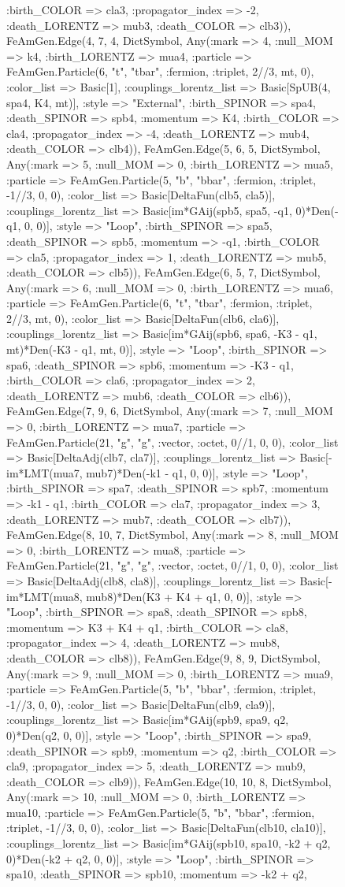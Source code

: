 \documentclass{revtex4}
\begin{document}
\begin{figure}[!htb]
\begin{center}
{:birth_COLOR => cla3, :propagator_index => -2, :death_LORENTZ => mub3, :death_COLOR => clb3)), FeAmGen.Edge(4, 7, 4, Dict{Symbol, Any}(:mark => 4, :null_MOM => k4, :birth_LORENTZ => mua4, :particle => FeAmGen.Particle(6, "t", "tbar", :fermion, :triplet, 2//3, mt, 0), :color_list => Basic[1], :couplings_lorentz_list => Basic[SpUB(4, spa4, K4, mt)], :style => "External", :birth_SPINOR => spa4, :death_SPINOR => spb4, :momentum => K4, :birth_COLOR => cla4, :propagator_index => -4, :death_LORENTZ => mub4, :death_COLOR => clb4)), FeAmGen.Edge(5, 6, 5, Dict{Symbol, Any}(:mark => 5, :null_MOM => 0, :birth_LORENTZ => mua5, :particle => FeAmGen.Particle(5, "b", "bbar", :fermion, :triplet, -1//3, 0, 0), :color_list => Basic[DeltaFun(clb5, cla5)], :couplings_lorentz_list => Basic[im*GAij(spb5, spa5, -q1, 0)*Den(-q1, 0, 0)], :style => "Loop", :birth_SPINOR => spa5, :death_SPINOR => spb5, :momentum => -q1, :birth_COLOR => cla5, :propagator_index => 1, :death_LORENTZ => mub5, :death_COLOR => clb5)), FeAmGen.Edge(6, 5, 7, Dict{Symbol, Any}(:mark => 6, :null_MOM => 0, :birth_LORENTZ => mua6, :particle => FeAmGen.Particle(6, "t", "tbar", :fermion, :triplet, 2//3, mt, 0), :color_list => Basic[DeltaFun(clb6, cla6)], :couplings_lorentz_list => Basic[im*GAij(spb6, spa6, -K3 - q1, mt)*Den(-K3 - q1, mt, 0)], :style => "Loop", :birth_SPINOR => spa6, :death_SPINOR => spb6, :momentum => -K3 - q1, :birth_COLOR => cla6, :propagator_index => 2, :death_LORENTZ => mub6, :death_COLOR => clb6)), FeAmGen.Edge(7, 9, 6, Dict{Symbol, Any}(:mark => 7, :null_MOM => 0, :birth_LORENTZ => mua7, :particle => FeAmGen.Particle(21, "g", "g", :vector, :octet, 0//1, 0, 0), :color_list => Basic[DeltaAdj(clb7, cla7)], :couplings_lorentz_list => Basic[-im*LMT(mua7, mub7)*Den(-k1 - q1, 0, 0)], :style => "Loop", :birth_SPINOR => spa7, :death_SPINOR => spb7, :momentum => -k1 - q1, :birth_COLOR => cla7, :propagator_index => 3, :death_LORENTZ => mub7, :death_COLOR => clb7)), FeAmGen.Edge(8, 10, 7, Dict{Symbol, Any}(:mark => 8, :null_MOM => 0, :birth_LORENTZ => mua8, :particle => FeAmGen.Particle(21, "g", "g", :vector, :octet, 0//1, 0, 0), :color_list => Basic[DeltaAdj(clb8, cla8)], :couplings_lorentz_list => Basic[-im*LMT(mua8, mub8)*Den(K3 + K4 + q1, 0, 0)], :style => "Loop", :birth_SPINOR => spa8, :death_SPINOR => spb8, :momentum => K3 + K4 + q1, :birth_COLOR => cla8, :propagator_index => 4, :death_LORENTZ => mub8, :death_COLOR => clb8)), FeAmGen.Edge(9, 8, 9, Dict{Symbol, Any}(:mark => 9, :null_MOM => 0, :birth_LORENTZ => mua9, :particle => FeAmGen.Particle(5, "b", "bbar", :fermion, :triplet, -1//3, 0, 0), :color_list => Basic[DeltaFun(clb9, cla9)], :couplings_lorentz_list => Basic[im*GAij(spb9, spa9, q2, 0)*Den(q2, 0, 0)], :style => "Loop", :birth_SPINOR => spa9, :death_SPINOR => spb9, :momentum => q2, :birth_COLOR => cla9, :propagator_index => 5, :death_LORENTZ => mub9, :death_COLOR => clb9)), FeAmGen.Edge(10, 10, 8, Dict{Symbol, Any}(:mark => 10, :null_MOM => 0, :birth_LORENTZ => mua10, :particle => FeAmGen.Particle(5, "b", "bbar", :fermion, :triplet, -1//3, 0, 0), :color_list => Basic[DeltaFun(clb10, cla10)], :couplings_lorentz_list => Basic[im*GAij(spb10, spa10, -k2 + q2, 0)*Den(-k2 + q2, 0, 0)], :style => "Loop", :birth_SPINOR => spa10, :death_SPINOR => spb10, :momentum => -k2 + q2, }
\end{center}
\end{figure}
\end{document}
